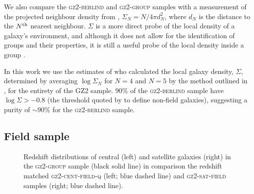 \documentclass[useAMS,usenatbib]{mn2e}
\begin{document}
We also compare the \textsc{gz2-berlind} and \textsc{gz2-group} samples with a measurement of the projected neighbour density from \cite{Baldry06}, $\Sigma_N = N/4\pi d_N^2$, where $d_N$ is the distance to the $N^{\rm{th}}$ nearest neighbour. $\Sigma$ is a more direct probe of the local density of a galaxy's environment, and although it does not allow for the identification of groups and their properties, it is still a useful probe of the local density inside a group  \cite[see][for a comparison of various environment parametrisations]{muldrew12}.

In this work we use the estimates of \cite{Bamford09} who calculated the local galaxy density, $\Sigma$, determined by averaging $\log\Sigma_N$ for $N = 4$ and $N=5$ by the method outlined in \citet{Baldry06}, for the entirety of the GZ2 sample. $90\%$ of the \textsc{gz2-berlind} sample have $\log\Sigma > -0.8$ (the threshold quoted by \citealt{Baldry06} to define non-field galaxies), suggesting a purity of $\sim90\%$ for the \textsc{gz2-berlind} sample.

\subsection{Field sample}\label{sec:field}

\begin{figure}
\caption[Redshift distribution of galaxies in the \textsc{gz2-group} sample]{Redshift distributions of central (left) and satellite galaxies (right) in the \textsc{gz2-group} sample (black solid line) in comparison the redshift matched \textsc{gz2-cent-field-q} (left; blue dashed line) and \textsc{gz2-sat-field} samples (right; blue dashed line).}
\label{fig:zcompare}
\end{figure}
\end{document}
